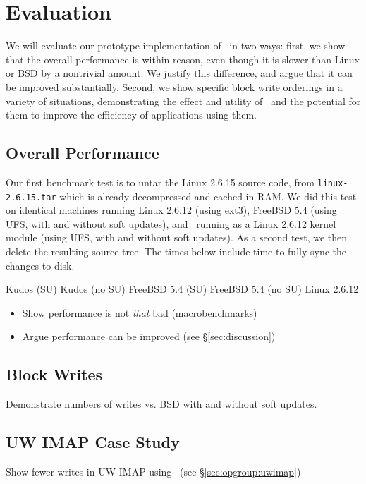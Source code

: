 \section {Evaluation}
\label{sec:evaluation}

We will evaluate our prototype implementation of \Kudos\ in two ways: first, we
show that the overall performance is within reason, even though it is slower
than Linux or BSD by a nontrivial amount. We justify this difference, and argue
that it can be improved substantially. Second, we show specific block write
orderings in a variety of situations, demonstrating the effect and utility of
\opgroups\ and the potential for them to improve the efficiency of applications
using them.

\subsection {Overall Performance}

Our first benchmark test is to untar the Linux 2.6.15 source code, from
\texttt{linux-2.6.15.tar} which is already decompressed and cached in RAM. We
did this test on identical machines running Linux 2.6.12 (using ext3), FreeBSD
5.4 (using UFS, with and without soft updates), and \Kudos\ running as a Linux
2.6.12 kernel module (using UFS, with and without soft updates). As a second
test, we then delete the resulting source tree. The times below include time to
fully sync the changes to disk.

Kudos (SU)
Kudos (no SU)
FreeBSD 5.4 (SU)
FreeBSD 5.4 (no SU)
Linux 2.6.12

\begin{itemize}
\item Show performance is not \emph{that} bad (macrobenchmarks)
\item Argue performance can be improved (see \S\ref{sec:discussion})
\end{itemize}

\subsection {Block Writes}
Demonstrate numbers of writes vs. BSD with and without soft updates.

\subsection {UW IMAP Case Study}
\label{sec:evaluation:uwimap}

Show fewer writes in UW IMAP using \opgroups\ (see \S\ref{sec:opgroup:uwimap})
